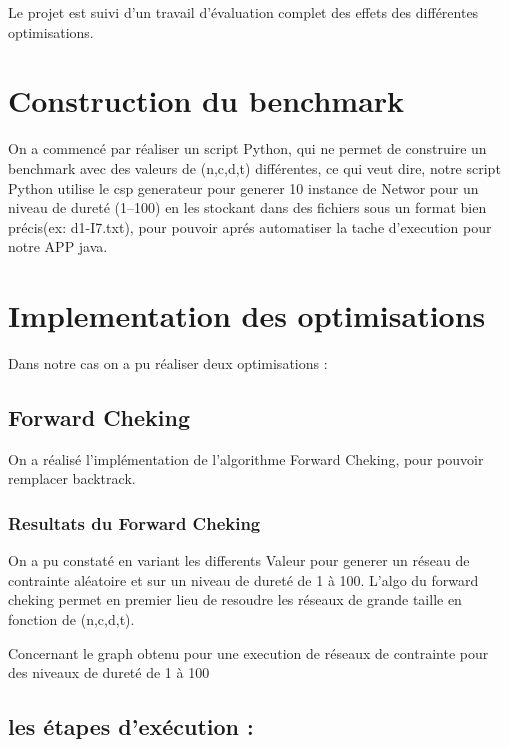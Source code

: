 \documentclass[oneside,13pt,a4paper]{article}
\begin{document}
Le projet est suivi d'un travail d'évaluation complet des effets des différentes optimisations.


\section {Construction du benchmark}
On a commencé par réaliser un script Python, qui ne permet de construire un benchmark avec des valeurs  de (n,c,d,t) différentes, ce qui veut dire, notre script Python utilise le csp generateur pour generer 10 instance de Networ pour un  niveau de dureté (1--100) en les stockant dans des fichiers sous un format bien précis(ex: d1-I7.txt), pour pouvoir aprés automatiser la tache d'execution pour notre APP java. 
\subsection{}

\section{Implementation des optimisations}
Dans notre cas on a pu réaliser deux optimisations : 
\subsection{Forward Cheking}

On a réalisé l'implémentation de l'algorithme Forward Cheking, pour pouvoir remplacer backtrack.
\subsubsection{Resultats du Forward Cheking }
On a pu constaté en variant les differents Valeur pour generer un réseau de contrainte aléatoire et sur un niveau de dureté de 1 à 100. L'algo du forward cheking permet en premier lieu de resoudre les réseaux de grande taille en fonction de (n,c,d,t).

Concernant le graph obtenu pour une execution de réseaux de contrainte pour des niveaux de dureté de 1 à 100

\subsection{les étapes d'exécution : }





\subsection{}
\end{document}
